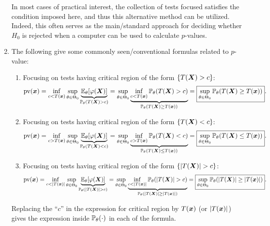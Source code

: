 \begin{enumerate}
\begin{note}
In most cases of practical interest, the collection of tests focused
satisfies the condition imposed here, and thus this alternative method can be
utilized.  Indeed, this often serves as the main/standard approach for deciding
whether \(H_0\) is rejected when a computer can be used to calculate
\(p\)-values.
\end{note}
\item \label{it:p-val-fmlas}
The following give some commonly seen/conventional formulas related to
\(p\)-value:
\begin{enumerate}
\item Focusing on tests having critical region of the form \(\{T(\vb*{X})>c\}\):
\[
\operatorname{pv}(\vb*{x})=\inf_{c<T(\vb*{x})}\sup_{\theta\in\Theta_0}
\underbrace{\mathbb{E}_{\theta}\qty[\varphi(\vb*{X})]}_{\mathbb{P}_{\theta}\qty(T(\vb*{X})>c)}
=\sup_{\theta\in\Theta_0}\underbrace{\inf_{c<T(\vb*{x})}\mathbb{P}_{\theta}\qty(T(\vb*{X})>c)}_{\mathbb{P}_{\theta}\qty(T(\vb*{X})\ge T(\vb*{x}))}
=\boxed{\sup_{\theta\in\Theta_0}\mathbb{P}_{\theta}\qty(T(\vb*{X})\ge T(\vb*{x}))}.
\]

\item Focusing on tests having critical region of the form \(\{T(\vb*{X})<c\}\):
\[
\operatorname{pv}(\vb*{x})=\inf_{c>T(\vb*{x})}\sup_{\theta\in\Theta_0}
\underbrace{\mathbb{E}_{\theta}\qty[\varphi(\vb*{X})]}_{\mathbb{P}_{\theta}\qty(T(\vb*{X})<c)}
=\sup_{\theta\in\Theta_0}\underbrace{\inf_{c>T(\vb*{x})}\mathbb{P}_{\theta}\qty(T(\vb*{X})<c)}_{\mathbb{P}_{\theta}\qty(T(\vb*{X})\le T(\vb*{x}))}
=\boxed{\sup_{\theta\in\Theta_0}\mathbb{P}_{\theta}\qty(T(\vb*{X})\le T(\vb*{x}))}.
\]

\item Focusing on tests having critical region of the form \(\{|T(\vb*{X})| >c\}\):
\[
\operatorname{pv}(\vect{x})=\inf_{c<|T(\vect{x})|}\sup_{\theta\in\Theta_0}
\underbrace{\expvtheta{\varphi(\vect{X})}}_{\probtheta{|T(\vect{X})|>c}}
=\sup_{\theta\in\Theta_0}\underbrace{\inf_{c<|T(\vect{x})|}\probtheta{|T(\vect{X})|>c}}_{\probtheta{|T(\vect{X})|\ge |T(\vect{x})|}}
=\boxed{\sup_{\theta\in\Theta_0}\probtheta{|T(\vect{X})|\ge |T(\vect{x})|}}.
\]
\end{enumerate}
\begin{mnemonic}
Replacing the ``\(c\)'' in the expression for critical region by
\(T(\vb*{x})\) (or \(|T(\vb*{x})|\)) gives the expression inside
\(\mathbb{P}_{\theta}\qty(\cdot)\) in each of the formula.
\end{mnemonic}


\end{enumerate}
